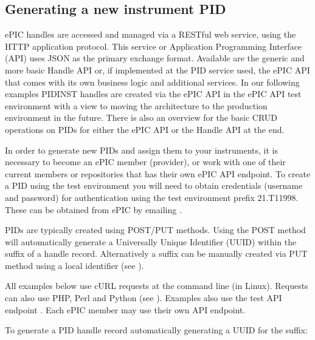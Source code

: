 \documentclass[a4paper,10pt,english]{sphinxmanual}
\begin{document}
\subsection{Generating a new instrument PID}
\label{\detokenize{epic-cookbook/handles:generating-a-new-instrument-pid}}
\sphinxAtStartPar
ePIC handles are accessed and managed via a RESTful web service, using
the HTTP application protocol.  This service or Application
Programming Interface (API) uses JSON as the primary exchange format.
Available are the generic and more basic Handle API or, if implemented
at the PID service used, the ePIC API that comes with its own business
logic and additional services.  In our following examples PIDINST
handles are created via the ePIC API in the ePIC API test environment
with a view to moving the architecture to the production environment
in the future.  There is also an overview for the basic CRUD
operations on PIDs for either the ePIC API or the Handle API at the
end.

\sphinxAtStartPar
In order to generate new PIDs and assign them to your instruments, it
is necessary to become an ePIC member (provider), or work with one of
their current members or repositories that has their own ePIC API
endpoint.  To create a PID using the test environment you will need to
obtain credentials (username and password) for authentication using
the test environment prefix 21.T11998.  These can be obtained from
ePIC by emailing .

\sphinxAtStartPar
PIDs are typically created using POST/PUT methods.  Using the POST
method will automatically generate a Universally Unique Identifier
(UUID) within the suffix of a handle record.  Alternatively a suffix
can be manually created via PUT method using a local identifier (see
).

\sphinxAtStartPar
All examples below use cURL requests at the command line (in Linux).
Requests can also use PHP, Perl and Python (see
).  Examples also use
the test API endpoint .  Each
ePIC member may use their own API end\sphinxhyphen{}point.

\sphinxAtStartPar
To generate a PID handle record automatically generating a UUID for
the suffix:
\end{document}
